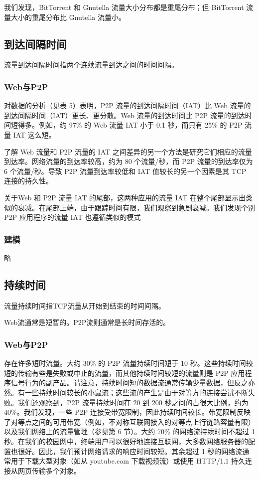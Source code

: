 我们发现，BitTorrent 和 Gnutella 流量大小分布都是重尾分布；但 BitTorrent 流量大小的重尾分布比 Gnutella 流量小。

\subsection{到达间隔时间}

流量到达间隔时间指两个连续流量到达之间的时间间隔。

\subsubsection{Web与P2P}

对数据的分析（见表 5）表明，P2P 流量的到达间隔时间（IAT）比 Web 流量的到达间隔时间（IAT）更长、更分散。Web 流量的到达时间比 P2P 流量的到达时间短得多。例如，约 97\% 的 Web 流量 IAT 小于 0.1 秒，而只有 25\% 的 P2P 流量 IAT 这么短。

了解 Web 流量和 P2P 流量的 IAT 之间差异的另一个方法是研究它们相应的流量到达率。网络流量的到达率较高，约为 80 个流量/秒，而 P2P 流量的到达率仅为 6 个流量/秒。导致 P2P 流量到达率较低和 IAT 值较长的另一个因素是其 TCP 连接的持久性。

关于Web 和 P2P 流量 IAT 的尾部，这两种应用的流量 IAT 在整个尾部显示出类似的衰减。在尾部上端，由于跟踪时间有限，我们观察到急剧衰减。我们发现个别 P2P 应用程序的流量 IAT 也遵循类似的模式

\subsubsection{建模}

略

\subsection{持续时间}

流量持续时间指TCP流量从开始到结束的时间间隔。

Web流通常是短暂的。P2P流则通常是长时间存活的。

\subsubsection{Web与P2P}

存在许多短时流量。大约 30\% 的 P2P 流量持续时间短于 10 秒。这些持续时间较短的传输有些是失败或中止的流量，而其他持续时间较短的流量则是 P2P 应用程序信号行为的副产品。请注意，持续时间短的数据流通常传输少量数据，但反之亦然。有一些持续时间较长的小鼠流；这些流的产生是由于对等方的连接尝试不断失败。我们还观察到，P2P 流量持续时间在 20 到 200 秒之间的占很大比例，约为 40\%。我们发现，一些 P2P 连接受带宽限制，因此持续时间较长。带宽限制反映了对等点之间的可用带宽（例如，不对称互联网接入的对等点上行链路容量有限）以及我们网络上的流量管理（参见第 6 节）。大约 70\% 的网络流持续时间不超过 1 秒。在我们的校园网中，终端用户可以很好地连接互联网，大多数网络服务器的配置也很好。因此，我们预计网络请求的响应时间较短。其余超过 1 秒的网络流通常用于下载大型对象（如从 youtube.com 下载视频流）或使用 HTTP/1.1 持久连接从网页传输多个对象。

